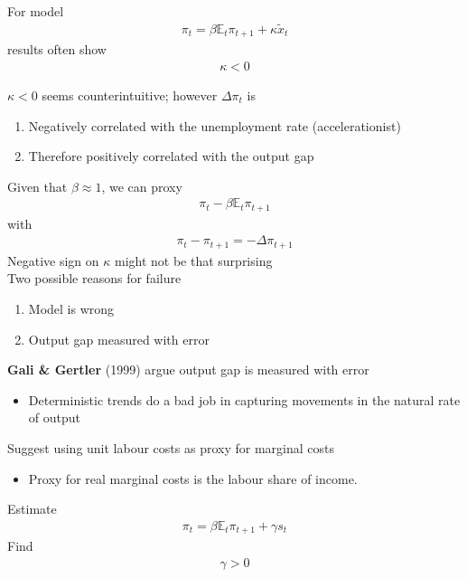 \documentclass{beamer}
\begin{document}
\begin{frame} 
  For model
  \begin{align*}
    \pi_t = \beta \mathbb{E}_t\pi_{t+1} + \kappa \tilde{x}_t
  \end{align*}
  results often show 
  \begin{align*}
    \kappa<0
  \end{align*}  
\end{frame}

\begin{frame}
$\kappa<0$ seems counterintuitive; however $\Delta\pi_t$ is
\begin{enumerate}
  \item  Negatively correlated with the unemployment rate (accelerationist)
  \item  Therefore positively correlated with the output gap
\end{enumerate} 
\medskip 
  Given that $\beta\approx1$, we can proxy
\begin{align}
  \pi_t-\beta \mathbb{E}_t\pi_{t+1}
\end{align} 
with 
\begin{align}
  \pi_t-\pi_{t+1}=-\Delta\pi_{t+1}
\end{align}
Negative sign on $\kappa$ might not be that surprising\\
Two possible reasons for failure
\begin{enumerate}
  \item Model is wrong
  \item Output gap measured with error
\end{enumerate}
\end{frame}


\begin{frame}
  \textbf{Gali \& Gertler} (1999) argue output gap is measured with error
  \begin{itemize}
    \item Deterministic trends do a bad job in capturing movements in the natural rate of output
  \end{itemize}
  \medskip
  Suggest using unit labour costs as proxy for marginal costs
  \begin{itemize}
    \item Proxy for real marginal costs is the labour share of income.
  \end{itemize}
  Estimate 
  \begin{align}
   \pi_t = \beta \mathbb{E}_t \pi_{t+1} + \gamma s_t    
  \end{align}
  Find
  \begin{align}
    \gamma>0
  \end{align} 
\end{frame}
\end{document}
